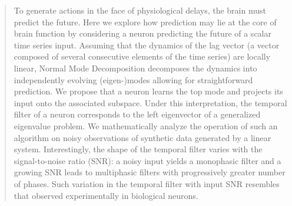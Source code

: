\documentclass[%
 reprint,
 amsmath,amssymb,
 aps,
]{revtex4-2}
\begin{document}
\begin{abstract}
To generate actions in the face of physiological delays, the brain must predict the future. Here we explore how prediction may lie at the core of brain function by considering a neuron predicting the future of a scalar time series input. Assuming that the dynamics of the lag vector (a vector composed of several consecutive elements of the time series) are locally linear, Normal Mode Decomposition  decomposes the dynamics into independently evolving (eigen-)modes allowing for straightforward prediction. We propose that a neuron learns the top mode and projects its input onto the associated subspace. Under this interpretation, the temporal filter of a neuron corresponds to the left eigenvector of a generalized eigenvalue problem. We mathematically analyze the operation of such an algorithm on noisy observations of synthetic data generated by a linear system. Interestingly, the shape of the temporal filter varies with the signal-to-noise ratio (SNR): a noisy input yields a monophasic filter and a growing SNR leads to multiphasic filters with progressively greater number of phases. Such variation in the temporal filter with input SNR resembles that observed experimentally in biological neurons.
\end{abstract}

\maketitle

\end{document}
